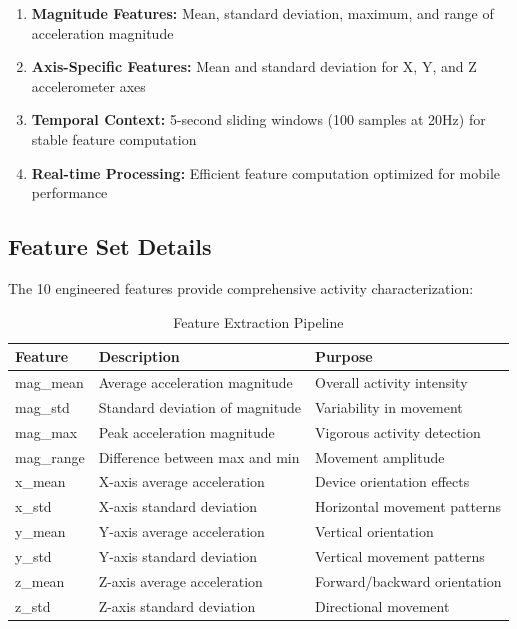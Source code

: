 \documentclass[11pt,a4paper]{article}
\begin{document}
\begin{enumerate}
    \item \textbf{Magnitude Features:} Mean, standard deviation, maximum, and range of acceleration magnitude
    \item \textbf{Axis-Specific Features:} Mean and standard deviation for X, Y, and Z accelerometer axes
    \item \textbf{Temporal Context:} 5-second sliding windows (100 samples at 20Hz) for stable feature computation
    \item \textbf{Real-time Processing:} Efficient feature computation optimized for mobile performance
\end{enumerate}

\subsection{Feature Set Details}

The 10 engineered features provide comprehensive activity characterization:

\begin{table}[H]
    \centering
    \caption{Feature Extraction Pipeline}
    \begin{tabular}{@{}lll@{}}
        \toprule
        \textbf{Feature} & \textbf{Description} & \textbf{Purpose} \\
        \midrule
        mag\_mean & Average acceleration magnitude & Overall activity intensity \\
        mag\_std & Standard deviation of magnitude & Variability in movement \\
        mag\_max & Peak acceleration magnitude & Vigorous activity detection \\
        mag\_range & Difference between max and min & Movement amplitude \\
        x\_mean & X-axis average acceleration & Device orientation effects \\
        x\_std & X-axis standard deviation & Horizontal movement patterns \\
        y\_mean & Y-axis average acceleration & Vertical orientation \\
        y\_std & Y-axis standard deviation & Vertical movement patterns \\
        z\_mean & Z-axis average acceleration & Forward/backward orientation \\
        z\_std & Z-axis standard deviation & Directional movement \\
        \bottomrule
    \end{tabular}
    \label{tab:features}
\end{table}
\end{document}
